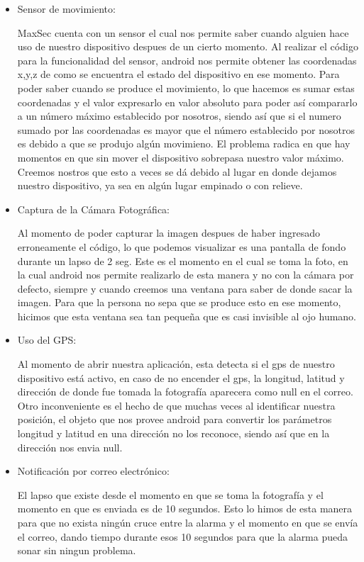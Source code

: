 \documentclass[12pt,letterpaper]{article}
\begin{document}
  
   \begin{itemize}
   \item Sensor de movimiento:
   
   MaxSec cuenta con un sensor el cual nos permite saber cuando alguien hace uso de nuestro dispositivo despues de un cierto momento. Al realizar el código para la funcionalidad del sensor, android nos permite obtener las coordenadas x,y,z de como se encuentra el estado del dispositivo en ese momento. Para poder saber cuando se produce el movimiento, lo que hacemos es sumar estas coordenadas y el valor expresarlo en valor absoluto para poder así compararlo a un número máximo establecido por nosotros, siendo así que si el numero sumado por las coordenadas es mayor que el número establecido por nosotros es debido a que se produjo algún movimieno. El problema radica en que hay momentos en que sin mover el dispositivo sobrepasa nuestro valor máximo.
Creemos nostros que esto a veces se dá debido al lugar en donde dejamos nuestro dispositivo, ya sea en algún lugar empinado o con relieve.
   
   \item Captura de la Cámara Fotográfica:
   
   Al momento de poder capturar la imagen despues de haber ingresado erroneamente el código, lo que podemos visualizar es una pantalla de fondo durante un lapso de 2 seg. Este es el momento en el cual se toma la foto, en la cual android nos permite realizarlo de esta manera y no con la cámara por defecto, siempre y cuando creemos una ventana para saber de donde sacar la imagen. Para que la persona no sepa que se produce esto en ese momento, hicimos que esta ventana sea tan pequeña que es casi invisible al ojo humano.
   
   \item Uso del GPS:
   
  Al momento de abrir nuestra aplicación, esta detecta si el gps de nuestro dispositivo está activo, en caso de no encender el gps, la longitud, latitud y dirección de donde fue tomada la fotografía aparecera como null en el correo.
Otro inconveniente es el hecho de que muchas veces al identificar nuestra posición, el objeto que nos provee android para convertir los parámetros longitud y latitud en una dirección no los reconoce, siendo así que en la dirección nos envia null.
   
   \item Notificación por correo electrónico:

  El lapso que existe desde el momento en que se toma la fotografía y el momento en que es enviada es de 10 segundos. Esto lo himos de esta manera para que no exista ningún cruce entre la alarma y el momento en que se envía el correo, dando tiempo durante esos 10 segundos para que la alarma pueda sonar sin ningun problema.
   \end{itemize}
   
\end{document}

